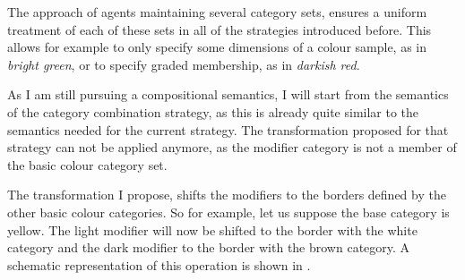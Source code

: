 The approach of agents maintaining several category sets, ensures a
uniform treatment of each of these sets in all of the strategies
introduced before. This allows for example to only specify some \enlargethispage{\baselineskip}
dimensions of a colour sample, as in \textit{bright green}, or to specify
graded membership, as in \textit{darkish red}.

As I am still pursuing a compositional semantics, I will start from
the semantics of the category combination strategy, as this is
already quite similar to the semantics needed for the current
strategy. The transformation proposed for that strategy can not be
applied anymore, as the modifier category is not a member of the basic
colour category set.

The transformation I propose, shifts the modifiers to the borders
defined by the other basic colour categories. So for example, let us
suppose the base category is yellow. The light modifier will now be
shifted to the border with the white category and the dark modifier to
the border with the brown category. A schematic representation of this
operation is shown in .

